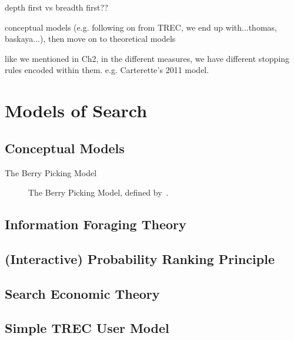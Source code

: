 depth first vs breadth first??

conceptual models (e.g. following on from TREC, we end up with...thomas, baskaya...), then move on to theoretical models

like we mentioned in Ch2, in the different measures, we have different stopping rules encoded within them.
e.g. Carterette's 2011 model.

\section{Models of Search}

\subsection{Conceptual Models}
The Berry Picking Model

\begin{figure}[t!]
    \centering
    \caption[The Berry Picking Model~\cite{bates1989berry_picking}]{The Berry Picking Model, defined by~\citealt{bates1989berry_picking}.}
    \label{fig:berry_picking}
\end{figure}


\subsection{Information Foraging Theory}

\subsection{(Interactive) Probability Ranking Principle}

\subsection{Search Economic Theory}

\subsection{Simple TREC User Model}

